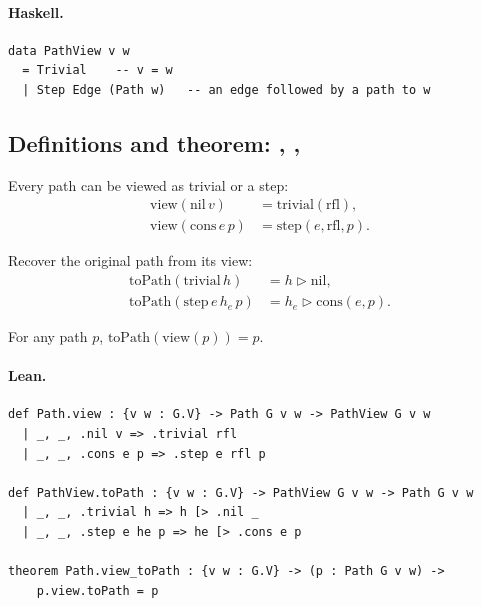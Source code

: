 \documentclass[11pt,a4paper]{article}
\begin{document}
\paragraph{Haskell.}
\begin{lstlisting}[style=haskell]
data PathView v w
  = Trivial    -- v = w
  | Step Edge (Path w)   -- an edge followed by a path to w
\end{lstlisting}


\subsection{Definitions and theorem: , , }

\begin{defn}
Every path can be viewed as trivial or a step:
\begin{align*}
  \mathrm{view}(\mathrm{nil}\,v) &= \mathrm{trivial}(\mathrm{rfl}), \\
  \mathrm{view}(\mathrm{cons}\,e\,p) &= \mathrm{step}(e, \mathrm{rfl}, p).
\end{align*}
\end{defn}

\begin{defn}
Recover the original path from its view:
\begin{align*}
  \mathrm{toPath}(\mathrm{trivial}\,h) &= h \triangleright \mathrm{nil}, \\
  \mathrm{toPath}(\mathrm{step}\,e\,h_e\,p) &= h_e \triangleright \mathrm{cons}(e, p).
\end{align*}
\end{defn}

\begin{thm}
For any path $p$, $\mathrm{toPath}(\mathrm{view}(p)) = p$.
\end{thm}

\paragraph{Lean.}
\begin{lstlisting}[style=lean]
def Path.view : {v w : G.V} -> Path G v w -> PathView G v w
  | _, _, .nil v => .trivial rfl
  | _, _, .cons e p => .step e rfl p

def PathView.toPath : {v w : G.V} -> PathView G v w -> Path G v w
  | _, _, .trivial h => h [> .nil _
  | _, _, .step e he p => he [> .cons e p

theorem Path.view_toPath : {v w : G.V} -> (p : Path G v w) ->
    p.view.toPath = p
\end{lstlisting}
\end{document}
